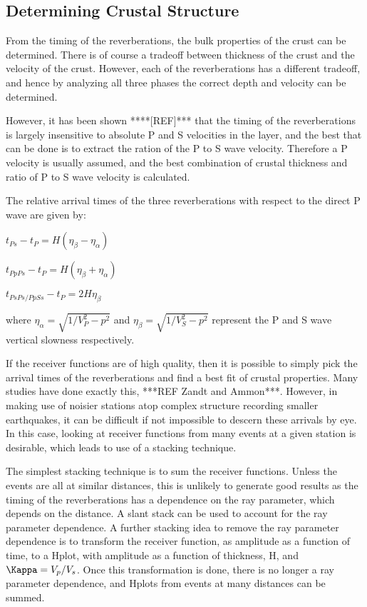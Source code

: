 \documentclass[titlepage]{article}
\begin{document}
\subsection{Determining Crustal Structure}

From the timing of the reverberations, the bulk properties of the crust can be determined. There is of course a tradeoff between thickness of the crust and the velocity of the crust. However, each of the reverberations has a different tradeoff, and hence by analyzing all three phases the correct depth and velocity can be determined.

However, it has been shown ****[REF]*** that the timing of the reverberations is largely insensitive to absolute P and S velocities in the layer, and the best that can be done is to extract the ration of the P to S wave velocity. Therefore a P velocity is usually assumed, and the best combination of crustal thickness and ratio of P to S wave velocity is calculated.

The relative arrival times of the three reverberations with respect to the direct P wave are given by:

$t_{Ps} - t_{P} = H ( \eta_\beta - \eta_\alpha )$

$t_{PpPs} - t_{P} = H ( \eta_\beta + \eta_\alpha )$

$t_{PsPs/PpSs} - t_{P} = 2 H \eta_\beta$

where $\eta_\alpha = \sqrt{1/V_P^2 - p^2}$ and $\eta_\beta = \sqrt{1/V_S^2 - p^2}$ represent the P and S wave vertical slowness respectively.

If the receiver functions are of high quality, then it is possible to simply pick the arrival times of the reverberations and find a best fit of crustal properties. Many studies have done exactly this, ***REF Zandt and Ammon***. However, in making use of noisier stations atop complex structure recording smaller earthquakes, it can be difficult if not impossible to descern these arrivals by eye. In this case, looking at receiver functions from many events at a given station is desirable, which leads to use of a stacking technique.

The simplest stacking technique is to sum the receiver functions. Unless the events are all at similar distances, this is unlikely to generate good results as the timing of the reverberations has a dependence on the ray parameter, which depends on the distance. A slant stack can be used to account for the ray parameter dependence. A further stacking idea to remove the ray parameter dependence is to transform the receiver function, as amplitude as a function of time, to a H\Kappa plot, with amplitude as a function of thickness, H, and $\Kappa = V_p/V_s$. Once this transformation is done, there is no longer a ray parameter dependence, and H\Kappa plots from events at many distances can be summed.
\end{document}
